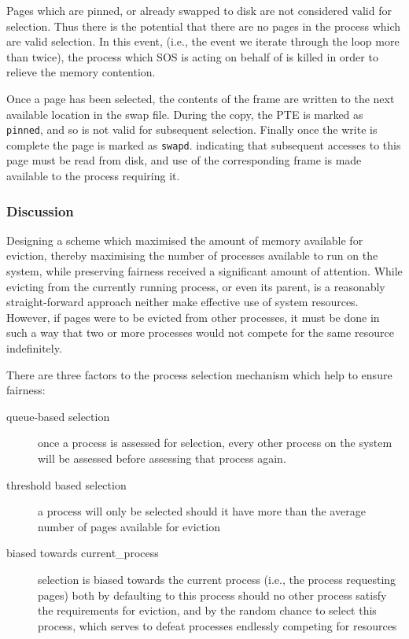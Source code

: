 \documentclass[a4paper,12pt]{article}
\begin{document}
Pages which are pinned, or already swapped to disk are not considered valid
for selection.  Thus there is the potential that there are no pages in the
process which are valid selection.  In this event, (i.e., the event we iterate
through the loop more than twice), the process which SOS is acting on behalf
of is killed in order to relieve the memory contention.

Once a page has been selected, the contents of the frame are written to the
next available location in the swap file.  During the copy, the PTE is marked
as \texttt{pinned}, and so is not valid for subsequent selection.  Finally once the
write is complete the page is marked as \texttt{swapd}. indicating that subsequent
accesses to this page must be read from disk, and use of the corresponding
frame is made available to the process requiring it.

\subsubsection{Discussion}
Designing a scheme which maximised the amount of memory available for
eviction, thereby maximising the number of processes available to run on the
system, while preserving fairness received a significant amount of attention.
While evicting from the currently running process, or even its parent, is a
reasonably straight-forward approach neither make effective use of system
resources.  However, if pages were to be evicted from other processes, it must
be done in such a way that two or more processes would not compete for the
same resource indefinitely.

There are three factors to the process selection mechanism which help to
ensure fairness:
\begin{description}
\item[queue-based selection] once a process is assessed for selection, every
  other process on the system will be assessed before assessing that process
  again.
\item[threshold based selection] a process will only be selected should it
  have more than the average number of pages available for eviction
\item[biased towards current\_process] selection is biased towards the current
  process (i.e., the process requesting pages) both by defaulting to this
  process should no other process satisfy the requirements for eviction, and
  by the random chance to select this process, which serves to defeat
  processes endlessly competing for resources
\end{description}
\end{document}
